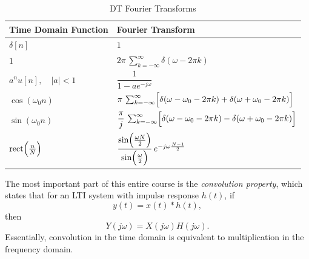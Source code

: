 \begin{table}[ht]
    \centering
    \caption{DT Fourier Transforms}
    \label{tab:dtfourier_transforms}
    \begin{tabular}{ll}
        \toprule
        \textbf{Time Domain Function}          & \textbf{Fourier Transform}                                                                                             \\
        \midrule
        $\delta[n]$                            & $1$                                                                                                                    \\[1mm]
        $1$                                    & $2\pi\,\sum_{k=-\infty}^{\infty}\delta(\omega-2\pi k)$                                                                 \\[1mm]
        $a^n u[n],\quad |a|<1$                 & $\dfrac{1}{1-ae^{-j\omega}}$                                                                                           \\[1mm]
        $\cos(\omega_0 n)$                     & $\pi\,\sum_{k=-\infty}^{\infty}\Bigl[\delta(\omega-\omega_0-2\pi k) + \delta(\omega+\omega_0-2\pi k)\Bigr]$            \\[1mm]
        $\sin(\omega_0 n)$                     & $\dfrac{\pi}{j}\,\sum_{k=-\infty}^{\infty}\Bigl[\delta(\omega-\omega_0-2\pi k) - \delta(\omega+\omega_0-2\pi k)\Bigr]$ \\[1mm]
        $\mathrm{rect}\Bigl(\frac{n}{N}\Bigr)$ & $\dfrac{\sin\Bigl(\frac{\omega N}{2}\Bigr)}{\sin\Bigl(\frac{\omega}{2}\Bigr)}\,e^{-j\omega\frac{N-1}{2}}$              \\
        \bottomrule
    \end{tabular}
\end{table}

The most important part of this entire course is the \emph{convolution property}, which states that 
for an LTI system with impulse response $h(t)$, if 
\begin{equation}
    y(t) = x(t) * h(t),
\end{equation}
then
\begin{equation}
    Y(j\omega) = X(j\omega)H(j\omega).
\end{equation}
Essentially, convolution in the time domain is equivalent to multiplication in the frequency domain. 

